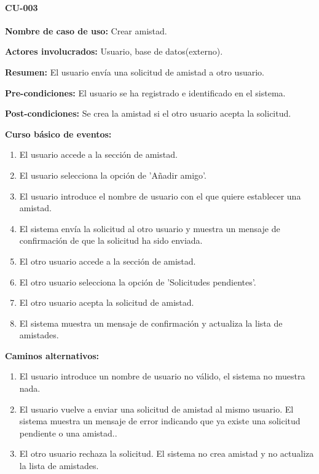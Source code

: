 \paragraph{CU-003}
\begin{description}
    \item \textbf{Nombre de caso de uso:} Crear amistad.
    \item \textbf{Actores involucrados:} Usuario, base de datos(externo).
    \item \textbf{Resumen:} El usuario envía una solicitud de amistad a otro usuario.
    \item \textbf{Pre-condiciones:} El usuario se ha registrado e identificado en el sistema.
    \item \textbf{Post-condiciones:} Se crea la amistad si el otro usuario acepta la solicitud.
    \item \textbf{Curso básico de eventos:} 
    \begin{enumerate}
            \item El usuario accede a la sección de amistad.
            \item El usuario selecciona la opción de 'Añadir amigo'.
            \item El usuario introduce el nombre de usuario con el que quiere establecer una amistad.
            \item El sistema envía la solicitud al otro usuario y muestra un mensaje de confirmación de 
            que la solicitud ha sido enviada.
            \item El otro usuario accede a la sección de amistad. 
            \item El otro usuario selecciona la opción de 'Solicitudes pendientes'.
            \item El otro usuario acepta la solicitud de amistad. 
            \item El sistema muestra un mensaje de confirmación y actualiza la lista de amistades.
    \end{enumerate}
    \item \textbf{Caminos alternativos:}
    \begin{enumerate}
        \item El usuario introduce un nombre de usuario no válido, el sistema no muestra nada. 
        \item El usuario vuelve a enviar una solicitud de amistad al mismo usuario. El sistema muestra 
        un mensaje de error indicando que ya existe una solicitud pendiente o una amistad..
        \item El otro usuario rechaza la solicitud. El sistema no crea amistad y no actualiza la lista de amistades.
    \end{enumerate}
\end{description}


